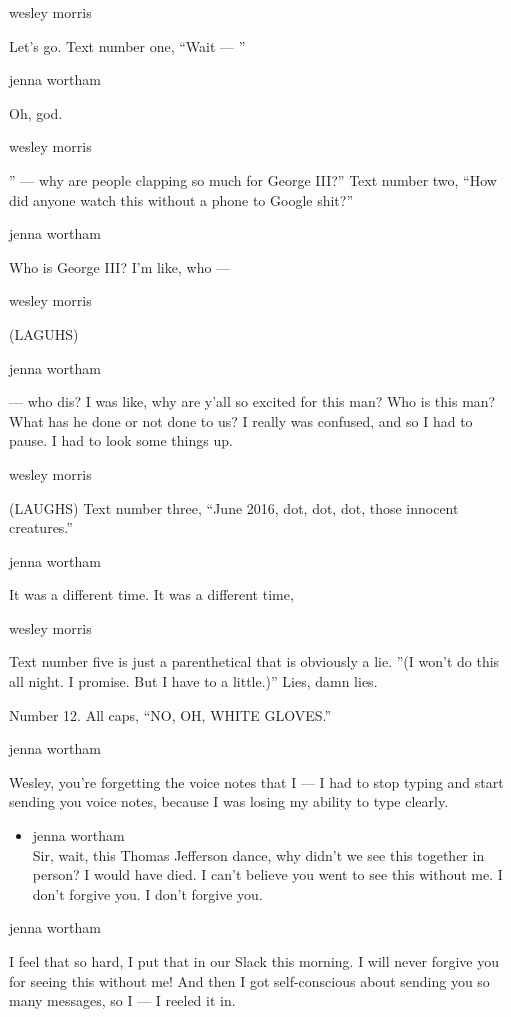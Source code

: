 wesley morris

Let's go. Text number one, ``Wait --- ''

jenna wortham

Oh, god.

wesley morris

'' --- why are people clapping so much for George III?'' Text number
two, ``How did anyone watch this without a phone to Google shit?''

jenna wortham

Who is George III? I'm like, who ---

wesley morris

(LAGUHS)

jenna wortham

--- who dis? I was like, why are y'all so excited for this man? Who is
this man? What has he done or not done to us? I really was confused, and
so I had to pause. I had to look some things up.

wesley morris

(LAUGHS) Text number three, ``June 2016, dot, dot, dot, those innocent
creatures.''

jenna wortham

It was a different time. It was a different time,

wesley morris

Text number five is just a parenthetical that is obviously a lie. ''(I
won't do this all night. I promise. But I have to a little.)'' Lies,
damn lies.

Number 12. All caps, ``NO, OH, WHITE GLOVES.''

jenna wortham

Wesley, you're forgetting the voice notes that I --- I had to stop
typing and start sending you voice notes, because I was losing my
ability to type clearly.

\begin{itemize}
\tightlist
\item
  jenna wortham\\
  Sir, wait, this Thomas Jefferson dance, why didn't we see this
  together in person? I would have died. I can't believe you went to see
  this without me. I don't forgive you. I don't forgive you.
\end{itemize}

jenna wortham

I feel that so hard, I put that in our Slack this morning. I will never
forgive you for seeing this without me! And then I got self-conscious
about sending you so many messages, so I --- I reeled it in.

